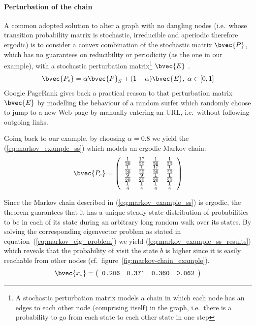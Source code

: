 \paragraph{Perturbation of the chain} A common adopted solution to alter a graph with no dangling nodes (i.e.\ whose transition probability matrix is stochastic, irreducible and aperiodic therefore ergodic) is to consider a convex combination of the stochastic matrix $\bvec{P}$, which has no guarantees on reducibility or periodicity (as the one in our example), with a stochastic perturbation matrix\footnote{A stochastic perturbation matrix models a chain in which each node has an edges to each other node (comprising itself) in the graph, i.e.\ there is a probability to go from each state to each other state in one step} $\bvec{E}$ \cite{page98, langville2004dip, langville2005sem, langville2006rpp, bianchini2005ip}.
\begin{equation}\label{eq:markov_convex_combination}
\bvec{P_e} = \alpha \bvec{P}_S + (1-\alpha) \bvec{E}, \; \alpha \in [0,1]
\end{equation}
Google PageRank \cite{page98} gives back a practical reason to that perturbation matrix $\bvec{E}$ by modelling the behaviour of a random surfer which randomly choose to jump to a new Web page by manually entering an URL, i.e.\ without following outgoing links.

Going back to our example, by choosing $\alpha=0.8$ we yield the (\ref{eq:markov_example_ss}) which models an ergodic Markov chain:
\begin{equation}\label{eq:markov_example_ss}
\bvec{P_e} =
 \left(
 \begin{array}{cccc}
  \frac{1}{20} & \frac{17}{20} & \frac{1}{20} & \frac{1}{20} \\
  \frac{1}{20} & \frac{1}{20} & \frac{17}{20} & \frac{1}{20} \\
  \frac{9}{20} & \frac{9}{20} & \frac{1}{20} & \frac{1}{20} \\
  \frac{1}{4} & \frac{1}{4} & \frac{1}{4} & \frac{1}{4} \\
 \end{array}
 \right)
\end{equation}

Since the Markov chain described in (\ref{eq:markov_example_ss}) is ergodic, the theorem guarantees that it has a unique steady-state distribution of probabilities to be in each of its state during an arbitrary long random walk over its states. By solving the corresponding eigenvector problem as stated in equation~(\ref{eq:markov_eig_problem}) we yield (\ref{eq:markov_example_ss_results}) which reveals that the probability of visit the state $b$ is higher since it is easily reachable from other nodes (cf.\ figure~\ref{fig:markov-chain_example}).
\begin{equation}\label{eq:markov_example_ss_results}
\bvec{x_s}=
\left(
 \begin{array}{cccc}
  \texttt{0.206} & \texttt{0.371} & \texttt{0.360} & \texttt{0.062}
 \end{array}
 \right)
\end{equation}


